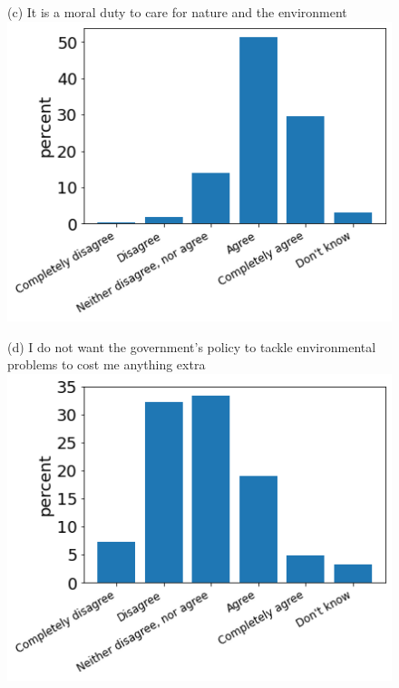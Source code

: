 \documentclass[12pt]{article}
\begin{document}
\begin{figure}[h!!]
\begin{minipage}[h!!]{0.32\textwidth}
	\end{minipage}
	\begin{minipage}[h!!]{0.32\textwidth}  
		\centering\footnotesize{(c) It is a moral duty to care for nature and the environment}
		\includegraphics[width=1\textwidth]{../codding_data/results/liss/qk20a183title0.png}
	\end{minipage}	
\begin{minipage}[h!!]{0.32\textwidth}  
\centering\footnotesize{(d) I do not want the government's policy to tackle environmental problems to cost me anything extra}
\includegraphics[width=1\textwidth]{../codding_data/results/liss/qk20a178title0.png}

\end{minipage}
\end{figure}
\end{document}
